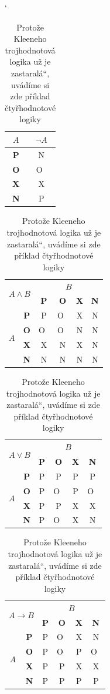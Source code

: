 \documentclass[a4paper,11pt]{article}
\newcommand{\myuv}[1]{\quotedblbase #1\textquotedblleft}
\begin{document}
	\begin{table}[ht]
		\catcode`
		\begin{center}
			\begin{tabular}{| c | c |}
				\hline
				$A$ & $\neg A$ \\
				\hline
				\textbf{P} & N \\
				\hline
				\textbf{O} & O~\\
				\hline
				\textbf{X} & X \\
				\hline
				\textbf{N} & P \\
				\hline
				
			\end{tabular}
			\begin{tabular}{| c | c | c | c | c | c |}
				\hline
				\multicolumn{2}{|c|}{\multirow{2}{*}{$A \wedge B$}}& \multicolumn{4}{|c|}{$B$}\\
				\cline{3-6}
				\multicolumn{2}{|c|}{} & \textbf{P} & \textbf{O} & \textbf{X} & \textbf{N}\\
				\hline
				\multirow{4}{*}{$A$} & \textbf{P} & P & O~& X & N \\
				\cline{2-6}
				& \textbf{O} & O~& O~& N & N \\
				\cline{2-6}
				& \textbf{X} & X & N & X & N \\
				\cline{2-6}
				& \textbf{N} & N & N & N & N \\
				\hline
			\end{tabular}
			\begin{tabular}{| c | c | c | c | c | c |}
				\hline
				\multicolumn{2}{|c|}{\multirow{2}{*}{$A \vee B$}}& \multicolumn{4}{|c|}{$B$}\\
				\cline{3-6}
				\multicolumn{2}{|c|}{} & \textbf{P} & \textbf{O} & \textbf{X} & \textbf{N}\\
				\hline
				\multirow{4}{*}{$A$} & \textbf{P} & P & P & P & P \\
				\cline{2-6}
				& \textbf{O} & P & O~& P & O~\\
				\cline{2-6}
				& \textbf{X} & P & P & X & X \\
				\cline{2-6}
				& \textbf{N} & P & O~& X & N \\
				\hline
			\end{tabular}
			\begin{tabular}{| c | c | c | c | c | c |}
				\hline
				\multicolumn{2}{|c|}{\multirow{2}{*}{$A \to B$}}& \multicolumn{4}{|c|}{$B$}\\
				\cline{3-6}
				\multicolumn{2}{|c|}{} & \textbf{P} & \textbf{O} & \textbf{X} & \textbf{N}\\
				\hline
				\multirow{4}{*}{$A$} & \textbf{P} & P & O~& X & N \\
				\cline{2-6}
				& \textbf{O} & P & O~& P & O~\\
				\cline{2-6}
				& \textbf{X} & P & P & X & X \\
				\cline{2-6}
				& \textbf{N} & P & P & P & P \\
				\hline
			\end{tabular}
			\caption{Protože Kleeneho trojhodnotová logika už je \myuv{zastaralá}, uvádíme si zde příklad čtyřhodnotové logiky}
			\label{tabPrav}
		\end{center}
	\end{table}
\end{document}
